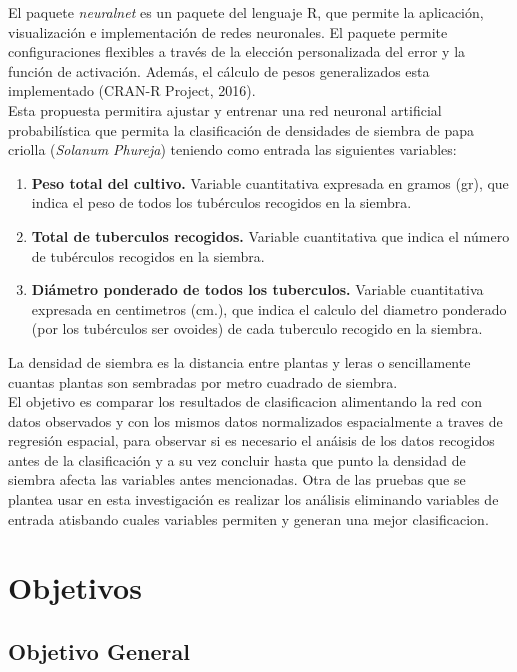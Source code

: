 El paquete \textit{neuralnet} es un paquete del lenguaje R,  que permite la aplicación, visualización e implementación de redes neuronales. El paquete permite configuraciones flexibles a través de la elección personalizada del error y la función de activación. Además, el cálculo de pesos generalizados esta implementado (CRAN-R Project, 2016).\\

Esta propuesta permitira ajustar y entrenar una red neuronal artificial probabil\'istica que permita la clasificación de densidades de siembra de papa criolla (\textit{Solanum Phureja}) teniendo como entrada las siguientes variables: 

\begin{enumerate}
    \item{\textbf{Peso total del cultivo.} Variable cuantitativa expresada en gramos (gr), que indica el peso de todos los tubérculos recogidos en la siembra.}
	\item{\textbf{Total de tuberculos recogidos.} Variable cuantitativa que indica el número de tubérculos recogidos en la siembra.}
	\item{\textbf{Diámetro ponderado de todos los tuberculos.} Variable cuantitativa expresada en centimetros (cm.), que indica el calculo del diametro ponderado (por los tubérculos ser ovoides) de cada tuberculo recogido en la siembra.}
\end{enumerate}

La densidad de siembra es la distancia entre plantas y leras o sencillamente cuantas plantas son sembradas por metro cuadrado de siembra.\\

El objetivo es comparar los resultados de clasificacion alimentando la red con datos observados y con los mismos datos normalizados espacialmente a traves de regresión espacial, para observar si es necesario el anáisis de los datos recogidos antes de la clasificación y a su vez concluir hasta que punto la densidad de siembra afecta las variables antes mencionadas. Otra de las pruebas que se plantea usar en esta investigación es realizar los análisis eliminando variables de entrada atisbando cuales variables permiten y generan una mejor clasificacion.\\

\section{Objetivos}

\subsection{Objetivo General}

